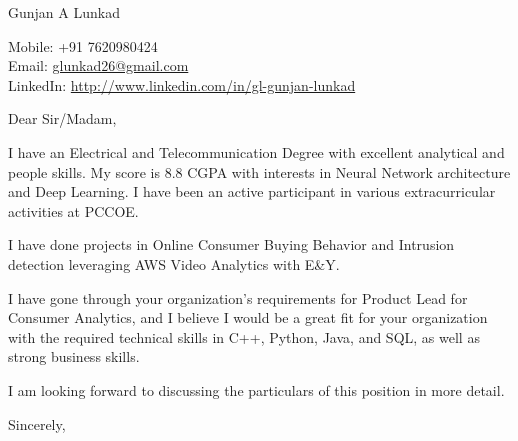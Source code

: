 \documentclass[a4paper,12pt]{letter}
\begin{document}
\begin{letter}{}

    \begin{center}
        Gunjan A Lunkad
    \end{center}

    \begin{flushright}
        Mobile: +91 7620980424 \\
        Email: \href{mailto:glunkad26@gmail.com}{glunkad26@gmail.com} \\
        LinkedIn: \href{http://www.linkedin.com/in/gl-gunjan-lunkad}{http://www.linkedin.com/in/gl-gunjan-lunkad}
    \end{flushright}

    \opening{Dear Sir/Madam,}

    I have an Electrical and Telecommunication Degree with excellent analytical and people skills. My score is 8.8 CGPA with interests in Neural Network architecture and Deep Learning. I have been an active participant in various extracurricular activities at PCCOE.

    I have done projects in Online Consumer Buying Behavior and Intrusion detection leveraging AWS Video Analytics with E\&Y.

    I have gone through your organization's requirements for Product Lead for Consumer Analytics, and I believe I would be a great fit for your organization with the required technical skills in C++, Python, Java, and SQL, as well as strong business skills.

    I am looking forward to discussing the particulars of this position in more detail.

    \closing{Sincerely, }
    \vspace{2cm}  %



\end{letter}
\end{document}
